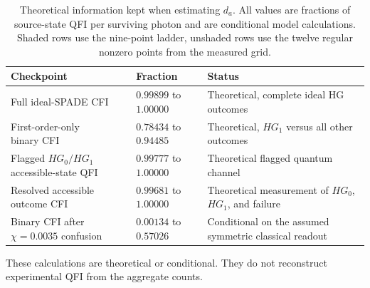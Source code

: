 \begin{table}[!htb]
    \centering
    \caption{Theoretical information kept when estimating $d_a$.  All values are fractions of source-state QFI per surviving photon and are conditional model calculations. Shaded rows use the nine-point ladder, unshaded rows use the twelve regular nonzero points from the measured grid.}
    \label{tab:spade_information_comparison}
    \begin{tabularx}{\textwidth}{p{4.8cm} p{1.9cm} X}
        \toprule
        \textbf{Checkpoint}  & \textbf{Fraction}      & \textbf{Status} \\
        \midrule
        Full ideal-SPADE CFI & \makecell[l]{$0.99899$                   \\ to $1.00000$} & Theoretical, complete ideal HG outcomes                \\
        \makecell[l]{First-order-only                                   \\ binary CFI  }                          & \makecell[l]{$0.78434$                   \\ to $0.94485$} & Theoretical, $HG_1$ versus all other outcomes          \\
        \rowcolor{gray!20}
        \makecell[l]{Flagged $HG_0/HG_1$                                \\ accessible-state QFI} & \makecell[l]{$0.99777$                   \\ to $1.00000$} & Theoretical flagged quantum channel                    \\
        \rowcolor{gray!20}
        \makecell[l]{Resolved accessible                                \\ outcome CFI}          & \makecell[l]{$0.99681$                   \\ to $1.00000$} & Theoretical measurement of $HG_0$, $HG_1$, and failure \\
        \rowcolor{gray!20}
        \makecell[l]{Binary CFI                                         \\ after $\chi=0.0035$ confusion} & \makecell[l]{$0.00134$                \\ to $0.57026$} & Conditional on the assumed symmetric classical readout \\
        \bottomrule
    \end{tabularx}
\end{table}

These calculations are theoretical or conditional.  They do not reconstruct experimental QFI from the aggregate counts.
